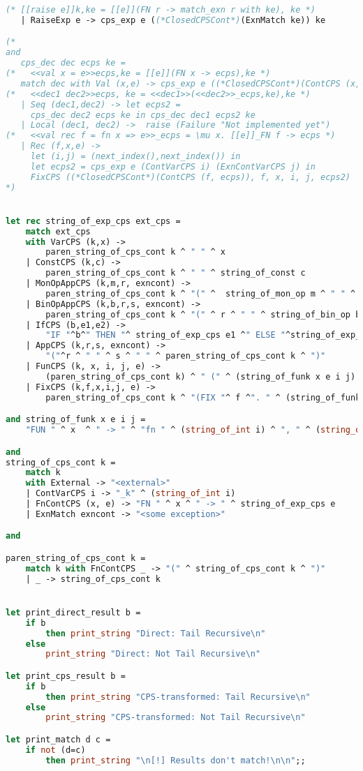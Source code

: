 \begin{lstlisting}[language=Caml, caption=definitions.ml]
(* [[raise e]]k,ke = [[e]](FN r -> match_exn r with ke), ke *)
   | RaiseExp e -> cps_exp e ((*ClosedCPSCont*)(ExnMatch ke)) ke

(*
and
   cps_dec dec ecps ke =
(*   <<val x = e>>ecps,ke = [[e]](FN x -> ecps),ke *)
   match dec with Val (x,e) -> cps_exp e ((*ClosedCPSCont*)(ContCPS (x, ecps))) ke
(*   <<dec1 dec2>>ecps, ke = <<dec1>>(<<dec2>>_ecps,ke),ke *)
   | Seq (dec1,dec2) -> let ecps2 =
     cps_dec dec2 ecps ke in cps_dec dec1 ecps2 ke
   | Local (dec1, dec2) ->  raise (Failure "Not implemented yet")
(*   <<val rec f = fn x => e>>_ecps = \mu x. [[e]]_FN f -> ecps *)
   | Rec (f,x,e) ->
     let (i,j) = (next_index(),next_index()) in
     let ecps2 = cps_exp e (ContVarCPS i) (ExnContVarCPS j) in
     FixCPS ((*ClosedCPSCont*)(ContCPS (f, ecps)), f, x, i, j, ecps2)
*)


let rec string_of_exp_cps ext_cps = 
    match ext_cps 
    with VarCPS (k,x) -> 
        paren_string_of_cps_cont k ^ " " ^ x 
    | ConstCPS (k,c) -> 
        paren_string_of_cps_cont k ^ " " ^ string_of_const c 
    | MonOpAppCPS (k,m,r, exncont) -> 
        paren_string_of_cps_cont k ^ "(" ^  string_of_mon_op m ^ " " ^ r ^ ")" 
    | BinOpAppCPS (k,b,r,s, exncont) -> 
        paren_string_of_cps_cont k ^ "(" ^ r ^ " " ^ string_of_bin_op b ^ " " ^ s ^")" 
    | IfCPS (b,e1,e2) -> 
        "IF "^b^" THEN "^ string_of_exp_cps e1 ^" ELSE "^string_of_exp_cps e2 
    | AppCPS (k,r,s, exncont) -> 
        "("^r ^ " " ^ s ^ " " ^ paren_string_of_cps_cont k ^ ")"  
    | FunCPS (k, x, i, j, e) ->  
        (paren_string_of_cps_cont k) ^ " (" ^ (string_of_funk x e i j) ^ ")" 
    | FixCPS (k,f,x,i,j, e) -> 
        paren_string_of_cps_cont k ^ "(FIX "^ f ^". " ^ (string_of_funk x e i j) ^ ")" 

and string_of_funk x e i j = 
    "FUN " ^ x  ^ " -> " ^ "fn " ^ (string_of_int i) ^ ", " ^ (string_of_int j) ^ " => " ^ string_of_exp_cps e 

and 
string_of_cps_cont k = 
    match k 
    with External -> "<external>" 
    | ContVarCPS i -> "_k" ^ (string_of_int i) 
    | FnContCPS (x, e) -> "FN " ^ x ^ " -> " ^ string_of_exp_cps e 
    | ExnMatch exncont -> "<some exception>" 

and 

paren_string_of_cps_cont k = 
    match k with FnContCPS _ -> "(" ^ string_of_cps_cont k ^ ")" 
    | _ -> string_of_cps_cont k 


let print_direct_result b = 
    if b 
        then print_string "Direct: Tail Recursive\n"
    else 
        print_string "Direct: Not Tail Recursive\n"

let print_cps_result b = 
    if b 
        then print_string "CPS-transformed: Tail Recursive\n"
    else 
        print_string "CPS-transformed: Not Tail Recursive\n"

let print_match d c = 
    if not (d=c)
        then print_string "\n[!] Results don't match!\n\n";;
\end{lstlisting}